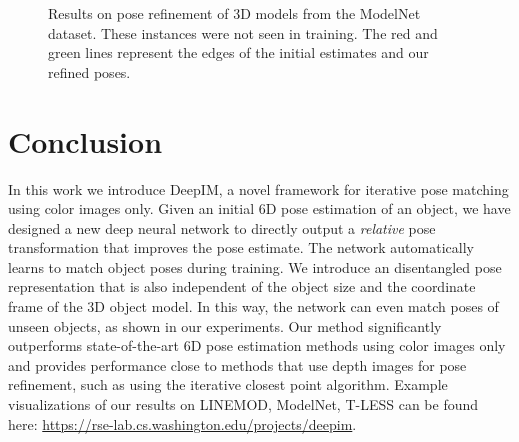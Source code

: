\documentclass[twocolumn]{svjour3}
\newcommand{\dimnet}[0]{DeepIM}
\begin{document}
\begin{figure*}[!ht]
{}
\hfill
{}
\hfill
{}
\hfill
\caption{Results on pose refinement of 3D models from the ModelNet dataset. These instances were not seen in training. The red and green lines represent the edges of the initial estimates and our refined poses.}
\label{fig.unseen_demo}
\end{figure*}
\fi


%
\section{Conclusion}

In this work we introduce \dimnet, a novel framework for iterative pose matching using color images only. Given an initial 6D pose estimation of an object, we have designed a new deep neural network to directly output a \emph{relative} pose transformation that improves the pose estimate. The network automatically learns to match object poses during training. We introduce an disentangled pose representation that is also independent of the object size and the coordinate frame of the 3D object model. In this way, the network can even match poses of unseen objects, as shown in our experiments. Our method significantly outperforms state-of-the-art 6D pose estimation methods using color images only and provides performance close to methods that use depth images for pose refinement, such as using the iterative closest point algorithm. Example visualizations of our results on LINEMOD, ModelNet, T-LESS can be found here: \url{https://rse-lab.cs.washington.edu/projects/deepim}.
\end{document}
